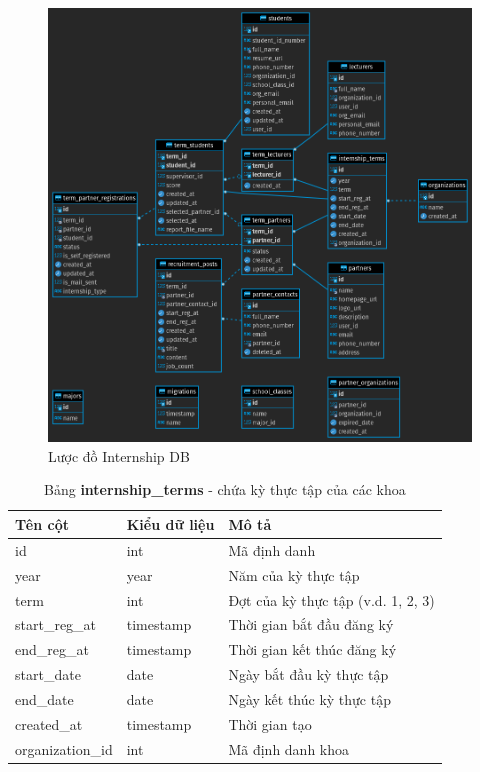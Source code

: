 \documentclass[./../main.tex]{subfiles}
\begin{document}
\begin{figure}
	\includegraphics[width=\linewidth]{./images/image1.png}
	\caption{Lược đồ Internship DB}
	\label{fig:internship_db_design}
\end{figure}

\begin{table}[H]
	\caption[Bảng internship\_terms]{Bảng \textbf{internship\_terms} - chứa kỳ thực tập của các khoa}
	\label{tab:db_terms}
	\begin{tabular}{|l|l|l|}
	\hline
	\textbf{Tên cột} & \textbf{Kiểu dữ liệu} & \textbf{Mô tả}                     \\ \hline
	id               & int                   & Mã định danh                       \\ \hline
	year             & year                  & Năm của kỳ thực tập                \\ \hline
	term             & int                   & Đợt của kỳ thực tập (v.d. 1, 2, 3) \\ \hline
	start\_reg\_at   & timestamp             & Thời gian bắt đầu đăng ký          \\ \hline
	end\_reg\_at     & timestamp             & Thời gian kết thúc đăng ký         \\ \hline
	start\_date      & date                  & Ngày bắt đầu kỳ thực tập           \\ \hline
	end\_date        & date                  & Ngày kết thúc kỳ thực tập          \\ \hline
	created\_at      & timestamp             & Thời gian tạo                      \\ \hline
	organization\_id & int                   & Mã định danh khoa                  \\ \hline
	\end{tabular}
\end{table}
\end{document}

